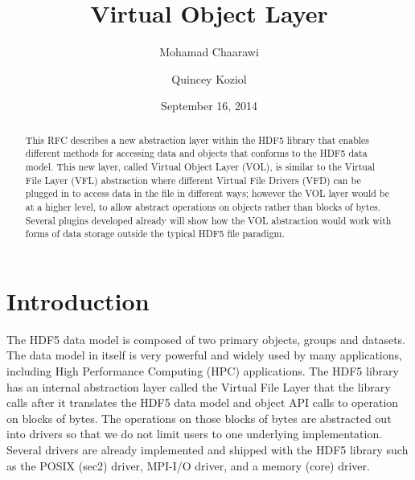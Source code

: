 \documentclass[letterpaper,hyper]{THG_RFC}
\title{Virtual Object Layer}
\author{Mohamad Chaarawi}
\author{Quincey Koziol}
\date{September 16, 2014}
\begin{document}
\maketitle

\begin{abstract}
This RFC describes a new abstraction layer within the HDF5 library that enables different methods for accessing data and objects that conforms to the HDF5 data model. This new layer, called Virtual Object Layer (VOL), is similar to the Virtual File Layer (VFL) abstraction where different Virtual File Drivers (VFD) can be plugged in to access data in the file in different ways; however the VOL layer would be at a higher level, to allow abstract operations on objects rather than blocks of bytes. Several plugins developed already will show how the VOL abstraction would work with forms of data storage outside the typical HDF5 file paradigm.
\end{abstract}

\section{Introduction}
The HDF5 data model is composed of two primary objects, groups and datasets. The data model in itself is very powerful and widely used by many applications, including High Performance Computing (HPC) applications. The HDF5 library has an internal abstraction layer called the Virtual File Layer that the library calls after it translates the HDF5 data model and object API calls to operation on blocks of bytes. The operations on those blocks of bytes are abstracted out into drivers so that we do not limit users to one underlying implementation. Several drivers are already implemented and shipped with the HDF5 library such as the POSIX (sec2) driver, MPI-I/O driver, and a memory (core) driver.
\end{document}
